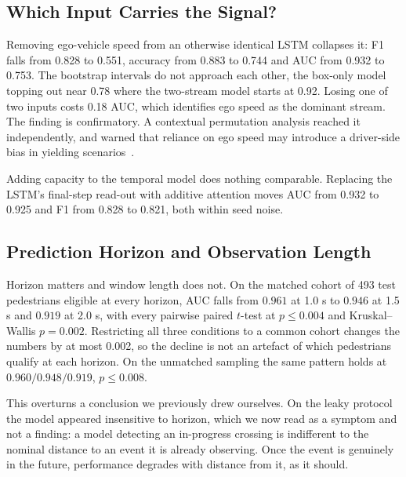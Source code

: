 \documentclass[mti,article,submit,moreauthors]{Definitions/mdpi}
\begin{document}
\subsection{Which Input Carries the Signal?}

Removing ego-vehicle speed from an otherwise identical LSTM collapses it: F1 falls from 0.828 to 0.551, accuracy from 0.883 to 0.744 and AUC from 0.932 to 0.753. The bootstrap intervals do not approach each other, the box-only model topping out near 0.78 where the two-stream model starts at 0.92. Losing one of two inputs costs 0.18 AUC, which identifies ego speed as the dominant stream. The finding is confirmatory. A contextual permutation analysis reached it independently, and warned that reliance on ego speed may introduce a driver-side bias in yielding scenarios~\citep{azarmi2024featureimportance}.

Adding capacity to the temporal model does nothing comparable. Replacing the LSTM's final-step read-out with additive attention moves AUC from 0.932 to 0.925 and F1 from 0.828 to 0.821, both within seed noise.

\subsection{Prediction Horizon and Observation Length}
\label{sec:horizon}

Horizon matters and window length does not. On the matched cohort of 493 test pedestrians eligible at every horizon, AUC falls from $0.961$ at 1.0 s to $0.946$ at 1.5 s and $0.919$ at 2.0 s, with every pairwise paired $t$-test at $p \le 0.004$ and Kruskal--Wallis $p = 0.002$. Restricting all three conditions to a common cohort changes the numbers by at most 0.002, so the decline is not an artefact of which pedestrians qualify at each horizon. On the unmatched sampling the same pattern holds at $0.960 / 0.948 / 0.919$, $p \le 0.008$.

This overturns a conclusion we previously drew ourselves. On the leaky protocol the model appeared insensitive to horizon, which we now read as a symptom and not a finding: a model detecting an in-progress crossing is indifferent to the nominal distance to an event it is already observing. Once the event is genuinely in the future, performance degrades with distance from it, as it should.
\end{document}
